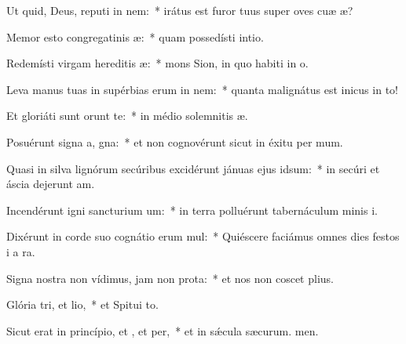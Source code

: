 \item Ut quid, Deus, reputi in nem:~* irátus est furor tuus super oves cuæ æ?
\item Memor esto congregatinis æ:~* quam possedísti  intio.
\item Redemísti virgam hereditis æ:~* mons Sion, in quo habiti in o.
\item Leva manus tuas in supérbias erum in nem:~* quanta malignátus est inicus in to!
\item Et gloriáti sunt  orunt te:~* in médio solemnitis æ.
\item Posuérunt signa a, gna:~* et non cognovérunt sicut in éxitu per mum.
\item Quasi in silva lignórum secúribus excidérunt jánuas ejus  idsum:~* in secúri et áscia dejerunt am.
\item Incendérunt igni sancturium um:~* in terra polluérunt tabernáculum minis i.
\item Dixérunt in corde suo cognátio erum mul:~* Quiéscere faciámus omnes dies festos i a ra.
\item Signa nostra non vídimus, jam non  prota:~* et nos non coscet plius.
\item Glória tri, et lio,~* et Spitui to.
\item Sicut erat in princípio, et , et per,~* et in sǽcula sæcurum. men.
